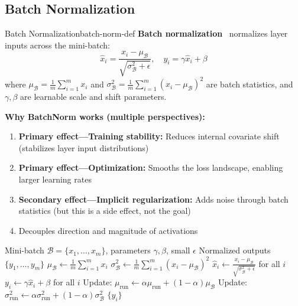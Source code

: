 \documentclass[../../main.tex]{subfiles}
\begin{document}
\subsection{Batch Normalization}
\label{sec:batch-norm}

\begin{definition}{Batch Normalization}{batch-norm-def}
\textbf{Batch normalization}~\cite{ioffe2015batch} normalizes layer inputs across the mini-batch:
\[
    \hat{x}_i = \frac{x_i - \mu_\mathcal{B}}{\sqrt{\sigma_\mathcal{B}^2 + \epsilon}}, \quad y_i = \gamma \hat{x}_i + \beta
\]
where $\mu_\mathcal{B} = \frac{1}{m}\sum_{i=1}^m x_i$ and $\sigma_\mathcal{B}^2 = \frac{1}{m}\sum_{i=1}^m (x_i - \mu_\mathcal{B})^2$ are batch statistics, and $\gamma, \beta$ are learnable scale and shift parameters.
\end{definition}

\begin{keyconcept}
\textbf{Why BatchNorm works (multiple perspectives):}
\begin{enumerate}
    \item \textbf{Primary effect---Training stability:} Reduces internal covariate shift (stabilizes layer input distributions)
    \item \textbf{Primary effect---Optimization:} Smooths the loss landscape, enabling larger learning rates
    \item \textbf{Secondary effect---Implicit regularization:} Adds noise through batch statistics (but this is a side effect, not the goal)
    \item Decouples direction and magnitude of activations
\end{enumerate}
\end{keyconcept}

\begin{algorithm}[htbp]
\caption{Batch Normalization: Training}
\label{alg:batchnorm-train}
\begin{algorithmic}[1]
\Require Mini-batch $\mathcal{B} = \{x_1, \ldots, x_m\}$, parameters $\gamma, \beta$, small $\epsilon$
\Ensure Normalized outputs $\{y_1, \ldots, y_m\}$
\State $\mu_\mathcal{B} \gets \frac{1}{m}\sum_{i=1}^m x_i$ 
\State $\sigma_\mathcal{B}^2 \gets \frac{1}{m}\sum_{i=1}^m (x_i - \mu_\mathcal{B})^2$ 
\State $\hat{x}_i \gets \frac{x_i - \mu_\mathcal{B}}{\sqrt{\sigma_\mathcal{B}^2 + \epsilon}}$ for all $i$ 
\State $y_i \gets \gamma \hat{x}_i + \beta$ for all $i$ 
\State Update: $\mu_{\text{run}} \gets \alpha\mu_{\text{run}} + (1-\alpha)\mu_\mathcal{B}$
\State Update: $\sigma^2_{\text{run}} \gets \alpha\sigma^2_{\text{run}} + (1-\alpha)\sigma^2_\mathcal{B}$
\State \Return $\{y_i\}$
\end{algorithmic}
\end{algorithm}
\end{document}
